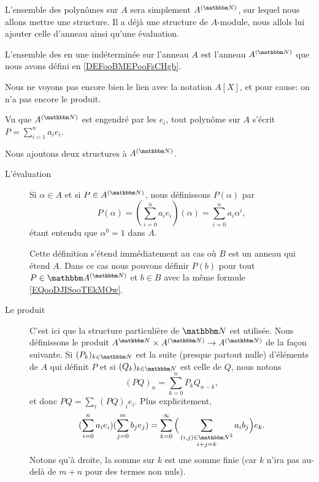 L'ensemble des polynômes sur \( A\) sera simplement \( A^{(\eN)}\), sur lequel nous allons mettre une structure. Il a déjà une structure de \( A\)-module, nous allols lui ajouter celle d'anneau ainsi qu'une évaluation.
\begin{definition}      \label{DEFooFYZRooMikwEL}
    L'ensemble des  en une indéterminée sur l'anneau \( A\) est l'anneau \( A^{(\eN)}\) que nous avons défini en \ref{DEFooBMEPooFsCHgb}.
\end{definition}

Nous ne voyons pas encore bien le lien avec la notation \( A[X]\), et pour cause: on n'a pas encore le produit.

Vu que \( A^{(\eN)}\) est engendré par les \( e_i\), tout polynôme sur \( A\) s'écrit \( P=\sum_{i=1}^na_ie_i\).

\begin{definition}      \label{DEFooNXKUooLrGeuh}
    Nous ajoutons deux structures à \( A^{(\eN)}\).
    \begin{description}
        \item[L'évaluation] Si \( \alpha\in A\) et si \( P\in A^{(\eN)}\), nous définissons \( P(\alpha)\) par
            \begin{equation}        \label{EQooDJISooTEkMOw}
                P(\alpha)=(\sum_{i=0}^{n}a_ie_i)(\alpha)=\sum_{i=0}^na_i\alpha^i,
            \end{equation}
            étant entendu que \( \alpha^0=1\) dans \( A\).

            Cette définition s'étend immédiatement au cas où \( B\) est un anneau qui étend \( A\). Dans ce cas nous pouvons définir \( P(b)\) pour tout \( P\in \eA^{(\eN)}\) et \( b\in B\) avec la même formule \eqref{EQooDJISooTEkMOw}.
        \item[Le produit] C'est ici que la structure particulière de \( \eN\) est utilisée. Nous définissons le produit \( A^{\eN}\times A^{(\eN)}\to A^{(\eN)}\) de la façon suivante. Si \( (P_k)_{k\in \eN}\) est la suite (presque partout nulle) d'éléments de \( A\) qui définit \( P\) et si \( (Q_k)_{k\in \eN}\) est celle de \( Q\), nous notons
        \begin{equation}    \label{EQooTNCSooKklisb}
            (PQ)_n=\sum_{k=0}^nP_kQ_{n-k},
        \end{equation}
        et donc \( PQ=\sum_i(PQ)_ie_i\). Plus explicitement,
        \begin{equation}    \label{EQooCIBUooAgpxjL}
            (\sum_{i=0}^na_ie_i)(\sum_{j=0}^mb_je_j)=\sum_{k=0}^{\infty}\Big( \sum_{\substack{  (i,j)\in \eN^2 \\i+j=k}}a_ib_j \Big)e_k.
        \end{equation}
        Notons qu'à droite, la somme sur \( k\) est une somme finie (car \(k \) n'ira pas au-delà de \( m + n \) pour des termes non nuls).
    \end{description}
\end{definition}

